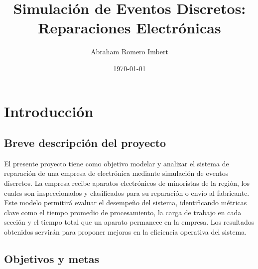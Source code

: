 \documentclass[a4paper,12pt]{article}
\title{Simulación de Eventos Discretos: Reparaciones Electrónicas}
\author{Abraham Romero Imbert}
\date{\today}
\begin{document}
\maketitle

\section{Introducción}

\subsection{Breve descripción del proyecto}

El presente proyecto tiene como objetivo modelar y analizar el sistema de reparación de 
una empresa de electrónica mediante simulación de eventos discretos. La empresa recibe 
aparatos electrónicos de minoristas de la región, los cuales son inspeccionados y clasificados 
para su reparación o envío al fabricante. Este modelo permitirá evaluar el desempeño del sistema, 
identificando métricas clave como el tiempo promedio de procesamiento, la carga de trabajo en 
cada sección y el tiempo total que un aparato permanece en la empresa. Los resultados obtenidos 
servirán para proponer mejoras en la eficiencia operativa del sistema.

\subsection{Objetivos y metas}
\end{document}
